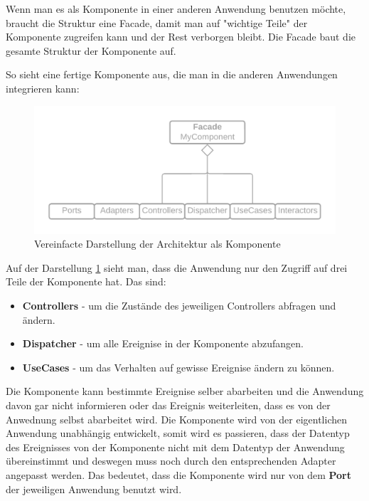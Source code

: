 \newpage
Wenn man es als Komponente in einer anderen Anwendung benutzen möchte, braucht die Struktur eine Facade, damit man 
auf "wichtige Teile" der Komponente zugreifen kann und der Rest verborgen bleibt. 
Die Facade baut die gesamte Struktur der Komponente auf.

So sieht eine fertige Komponente aus, die man in die anderen Anwendungen integrieren kann:

\begin{figure}[H]
    \centering
    \includegraphics[width=1\textwidth]{./images/Architecture as Facade.png}
    \caption{Vereinfacte Darstellung der Architektur als Komponente}
    \label{fig:SimpliedArchitectureAsKomponent}
\end{figure}

Auf der Darstellung \ref{fig:SimpliedArchitectureAsKomponent} sieht man, dass die Anwendung nur den Zugriff auf drei Teile der Komponente hat.
Das sind:
\begin{itemize}
    \item \textbf{Controllers} - um die Zustände des jeweiligen Controllers abfragen und ändern.
    \item \textbf{Dispatcher} - um alle Ereignise in der Komponente abzufangen.
    \item \textbf{UseCases} - um das Verhalten auf gewisse Ereignise ändern zu können.
\end{itemize}

Die Komponente kann bestimmte Ereignise selber abarbeiten und die Anwendung davon gar nicht informieren oder
das Ereignis weiterleiten, dass es von der Anwednung selbst abarbeitet wird.
Die Komponente wird von der eigentlichen Anwendung unabhängig entwickelt, somit wird es passieren, dass
der Datentyp des Ereignisses von der Komponente nicht mit dem Datentyp der Anwendung übereinstimmt und deswegen muss noch durch den entsprechenden Adapter angepasst werden.
Das bedeutet, dass die Komponente wird nur von dem \textbf{Port} der jeweiligen Anwendung benutzt wird.

